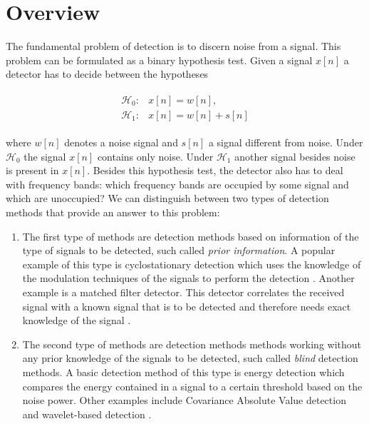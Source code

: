\documentclass[a4paper, openany, oneside]{memoir}
\begin{document}
\section{Overview}
The fundamental problem of detection is to discern noise from a signal. This problem can be formulated as a binary hypothesis test. Given a signal $x[n]$ a detector has to decide between the hypotheses

\begin{align*}
	\begin{array}{ll}
		\mathcal{H}_0: & x[n] = w[n], \\
		\mathcal{H}_1: & x[n] = w[n] + s[n]
	\end{array}
\end{align*}

where $w[n]$ denotes a noise signal and $s[n]$ a signal different from noise. Under $\mathcal{H}_0$ the signal $x[n]$ contains only noise. Under $\mathcal{H}_1$ another signal besides noise is present in $x[n]$. Besides this hypothesis test, the detector also has to deal with frequency bands: which frequency bands are occupied by some signal and which are unoccupied?
\clearpage
We can distinguish between two types of detection methods that provide an answer to this problem:
\begin{enumerate}
\item The first type of methods are detection methods based on information of the type of signals to be detected, such called \emph{prior information}.
A popular example of this type is cyclostationary detection which uses the knowledge of the modulation techniques of the signals to perform the detection \cite{axell2012spectrum,quan2009optimal}. Another example is a matched filter detector. This detector correlates the received signal with a known signal that is to be detected and therefore needs exact knowledge of the signal \cite{Kapoor2011Communication,couch2013digital}. 
\item The second type of methods are detection methods methods working without any prior knowledge of the signals to be detected, such called \emph{blind} detection methods.
A basic detection method of this type is energy detection \cite{axell2012spectrum} which compares the energy contained in a signal to a certain threshold based on the noise power. Other examples include Covariance Absolute Value detection \cite{zheng2009spectrum} and wavelet-based detection \cite{han2013novel}. 
\end{enumerate}
\end{document}
